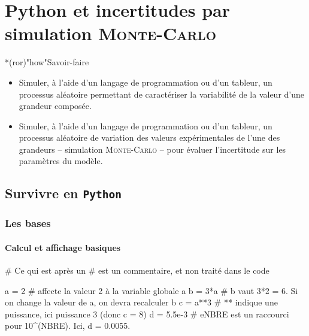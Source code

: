 \documentclass[a4paper, 12pt, garamond]{book}
\begin{document}
\setcounter{chapter}{5}

\chapter{Python et incertitudes par simulation \textsc{Monte-Carlo}}

\vfill

\begin{prgm}
  \begin{tcb}*(ror)"how"{Savoir-faire}
    \begin{itemize}[label=$\diamond$, leftmargin=10pt]
      \item Simuler, à l’aide d’un langage de programmation ou d’un tableur, un
        processus aléatoire permettant de caractériser la variabilité de la
        valeur d’une grandeur composée.
      \item Simuler, à l’aide d’un langage de programmation ou d’un tableur, un
        processus aléatoire de variation des valeurs expérimentales de l’une des
        grandeurs – simulation \textsc{Monte-Carlo} – pour évaluer l’incertitude
        sur les paramètres du modèle.
    \end{itemize}
  \end{tcb}
\end{prgm}

\vfill
\minitoc
\vfill

\newpage

\section{Survivre en \texttt{Python}}
\subsection{Les bases}
\subsubsection{Calcul et affichage basiques}
\begin{python}
# Ce qui est après un # est un commentaire, et non traité dans le code

a = 2       # affecte la valeur 2 à la variable globale a
b = 3*a     # b vaut 3*2 = 6. Si on change la valeur de a, on devra recalculer b
c = a**3    # ** indique une puissance, ici puissance 3 (donc c = 8)
d = 5.5e-3  # eNBRE est un raccourci pour 10^(NBRE). Ici, d = 0.0055.
\end{python}
\end{document}
